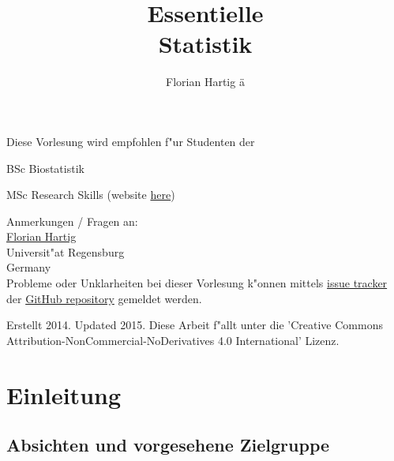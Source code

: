 \documentclass[a4paper,twoside]{tufte-book}\usepackage[]{graphicx}\usepackage[]{color}
\title{Essentielle\\Statistik}
\author{Florian Hartig ä}
\begin{document}

\let\cleardoublepage\clearpage %
\maketitle


\thispagestyle{empty}
\null

\begin{fullwidth}
Diese Vorlesung wird empfohlen f"ur Studenten der

\begin{itemize*}
  \item BSc Biostatistik
  \item MSc Research Skills (website \href{http://florianhartig.github.io/ResearchSkills/}{here})
\end{itemize*}

\vspace{0.5cm}

Anmerkungen / Fragen an:\\[0.5cm]
\href{https://florianhartig.wordpress.com/}{Florian Hartig}\\
Universit"at Regensburg\\
Germany\\[0.5cm]

Probleme oder Unklarheiten bei dieser Vorlesung k"onnen mittels \href{https://github.com/florianhartig/Statistics/issues}{issue tracker} der \href{https://github.com/florianhartig/Statistics/tree/master/EssentialStatistics}{GitHub repository} gemeldet werden. 

\end{fullwidth}


\vfill
\begin{fullwidth}
Erstellt 2014. Updated 2015. Diese Arbeit f"allt unter die 'Creative Commons Attribution-NonCommercial-NoDerivatives 4.0 International' Lizenz.
\end{fullwidth}


\newpage
\tableofcontents

\chapter{Einleitung} %

\section{Absichten und vorgesehene Zielgruppe}
\end{document}

